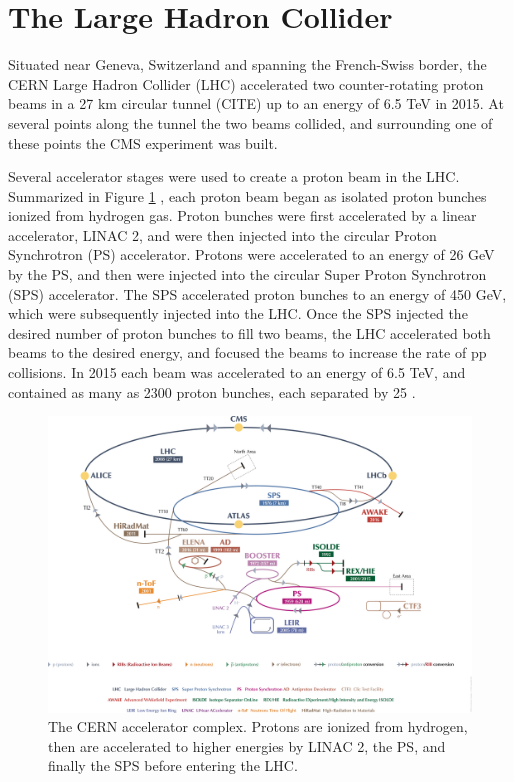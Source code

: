 \section{The Large Hadron Collider}
\label{sec:lhcDescription}
Situated near Geneva, Switzerland and spanning the French-Swiss border, the CERN Large Hadron Collider (LHC) accelerated 
two counter-rotating proton beams in a 27 km circular tunnel (CITE) up to an energy of 6.5 TeV in 2015.  At several points along the tunnel 
the two beams collided, and surrounding one of these points the CMS experiment was built.

Several accelerator stages were used to create a proton beam in the LHC.  Summarized in Figure \ref{fig:accelComplex} \cite{DeMelis:2197559}, each 
proton beam began as isolated proton bunches ionized from hydrogen gas.  Proton bunches were first accelerated by a linear 
accelerator, LINAC 2, and were then injected into the circular Proton Synchrotron (PS) accelerator.  Protons were accelerated 
to an energy of 26 GeV by the PS, and then were injected into the circular Super Proton Synchrotron (SPS) accelerator.  
The SPS accelerated proton bunches to an energy of 450 GeV, which were subsequently injected into the LHC.  Once the SPS 
injected the desired number of proton bunches to fill two beams, the LHC accelerated both beams to the desired energy, 
and focused the beams to increase the rate of pp collisions.  In 2015 each beam was accelerated to an energy of 6.5 TeV, and 
contained as many as 2300 proton bunches, each separated by 25 \ns.

\begin{figure}[ht]
	\centering
	\includegraphics[width=1\textwidth]{figures/CERNAcceleratorComplex.png}
	\caption{The CERN accelerator complex.  Protons are ionized from hydrogen, then are accelerated to higher 
	energies by LINAC 2, the PS, and finally the SPS before entering the LHC.}
	\label{fig:accelComplex}
\end{figure}


